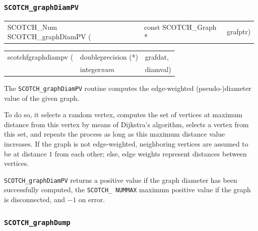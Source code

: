 \subsubsection{{\tt SCOTCH\_graphDiamPV}}

\begin{itemize}
\progsyn

{\tt\begin{tabular}{l@{}ll}
SCOTCH\_Num SCOTCH\_graphDiamPV ( & const SCOTCH\_Graph * & grafptr)
\end{tabular}}

{\tt\begin{tabular}{l@{}ll}
scotchfgraphdiampv ( & doubleprecision (*) & grafdat, \\
                     & integer{\it num}    & diamval)

\end{tabular}}

\progdes

The {\tt SCOTCH\_graphDiamPV} routine computes the edge-weighted
(pseudo-)diameter value of the given graph.

To do so, it selects a random vertex, computes the set of vertices at
maximum distance from this vertex by means of Dijkstra's algorithm,
selects a vertex from this set, and repeats the process as long as
this maximum distance value increases. If the graph is not
edge-weighted, neighboring vertices are assumed to be at distance $1$
from each other; else, edge weights represent distances between
vertices.

\progret

{\tt SCOTCH\_graphDiamPV} returns a positive value if the graph
diameter has been successfully computed, the \texttt{SCOTCH\_\lbt
NUMMAX} maximum positive value if the graph is disconnected, and $-1$
on error.
\end{itemize}

\subsubsection{{\tt SCOTCH\_graphDump}}

